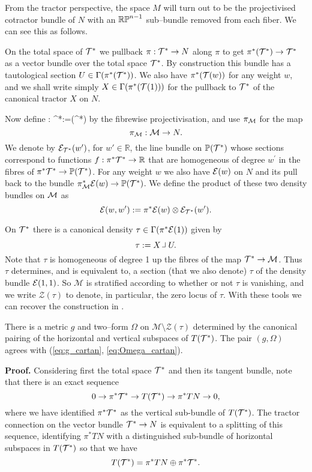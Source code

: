 From the tractor perspective, the space $M$ will turn out to be the projectivised cotractor bundle of $N$ with an $\mathbb{RP}^{n-1}$ sub--bundle removed from each fiber. We can see this as follows.

On the total space of $\mathcal{T}^*$ we pullback $\pi:\mathcal{T}^*\to N$ along $\pi$ to get $\pi^*(\mathcal{T}^*)\to \mathcal{T}^*$ as a vector bundle over the total space $\mathcal{T}^*$. By construction this bundle has a tautological section $U\in \Gamma (\pi^*(\mathcal{T}^*))$.  We also have $\pi^*(\mathcal{T}(w))$ for any weight $w$, and we shall write simply $X\in \Gamma(\pi^*(\mathcal{T}(1)))$ for the pullback to $\mathcal{T}^*$ of the canonical tractor $X$ on $N$.

Now define
\be
\label{projection_map}
\kappa: \cT^*\longrightarrow {}:=(\cT^*)
\ee
by the fibrewise projectivisation, and use $\pi_{\mathcal{M}}$ for the map
$$
\pi_{\mathcal{M}}:\mathcal{M}\to N.
$$
We denote by $\mathcal{E}_{\mathcal{T}^*}(w')$, for $w'\in \mathbb{R}$, the line
bundle on $\mathbb{P}(\mathcal{T}^*)$ whose sections correspond to functions
$f: \pi^*\mathcal{T}^* \to\mathbb{R} $ that are homogeneous of degree $w^\prime$ in
the fibres of $\pi^*\mathcal{T}^*\to \mathbb{P}(\mathcal{T}^*)$. For any weight $w$ we also have $\mathcal{E}(w)$ on $N$ and its pull back to the bundle $\pi_{\mathcal{M}}^*\mathcal{E}(w)\to \mathbb{P}(\mathcal{T}^*)$.
We define the product of these two density bundles on $\mathcal{M}$ as
$$
\mathcal{E}(w,w'):= \pi^*\mathcal{E}(w) \otimes \mathcal{E}_{\mathcal{T}^*}(w').
$$

On $\mathcal{T}^*$ there is  a canonical density $\tau\in \Gamma(\pi^*\mathcal{E}(1))$ given by
$$
\tau:= X\hook U .
$$
Note that $\tau$ is homogeneous of degree 1 up the fibres of the
map $\mathcal{T}^*\to \mathcal{M}$. Thus $\tau$ determines, and is equivalent
to, a section (that we also denote) $\tau$ of the density bundle $\mathcal{E}(1,1)$. So $\mathcal{M}$ is stratified according to
whether or not $\tau$ is vanishing, and we write $\mathcal{Z}(\tau)$
to denote, in particular, the zero locus of $\tau$. With these tools we can recover the construction in \cite{DM}.


\begin{theo}\cite{DGW}\label{metric} 
There is a metric $g$ and two--form $\Omega$ on $\mathcal{M}\setminus \mathcal{Z}(\tau)$ determined by the canonical pairing of the horizontal and vertical subspaces of $T(\mathcal{T}^*)$. The pair $(g,\Omega)$ agrees with (\ref{eq:g_cartan}, \ref{eq:Omega_cartan}).
\end{theo}
{\bf Proof.}
 Considering first the total space $\mathcal{T}^*$ and then its tangent
 bundle, note that there is an exact sequence
  \begin{equation}\label{TM}
0\to \pi^* \mathcal{T}^*\to T(\mathcal{T}^*)\to \pi^*TN\to 0,
  \end{equation}
  where we have identified $\pi^* \mathcal{T}^*$ as the vertical sub-bundle of $T(\mathcal{T}^*)$.
The tractor connection on the vector bundle $\mathcal{T}^*\to N$ is equivalent to a splitting of this sequence, identifying $\pi^*TN$ with a distinguished  sub-bundle of horizontal subspaces in 
$ T(\mathcal{T}^*)$ so that we have 
\begin{equation}\label{HV}
T(\mathcal{T}^*)=  \pi^*TN\oplus \pi^* \mathcal{T}^* .
\end{equation}

